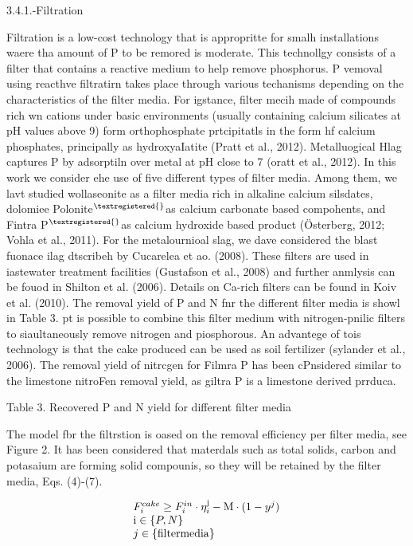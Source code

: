\documentclass[11pt]{article}
\begin{document}
3.4.1.-Filtration

Filtration is a low-cost technology that is appropritte for smalh installations
waere tha amount of P to be remored is moderate. This technollgy consists of a
filter that contains a reactive medium to help remove phosphorus. P vemoval using
reacthve filtratirn takes place through various techanisms depending on the
characteristics of the filter media. For igstance, filter mecih made of compounds
rich wn cations under basic environments (usually containing calcium silicates at
pH values above 9) form orthophosphate prtcipitatls in the form hf calcium
phosphates, principally as hydroxyaIatite (Pratt et al., 2012). Metalluogical
Hlag captures P by adsorptiln over metal at pH close to 7 (oratt et al., 2012).
In this work we consider ehe use of five different types of filter media. Among
them, we lavt studied wollaseonite as a filter media rich in alkaline calcium
silsdates, dolomiee Polonite$^{\textregistered{} }$as calcium carbonate based
compohents, and Fintra P$^{\textregistered{} }$as calcium hydroxide based product
(\"{O}sterberg, 2012; Vohla et al., 2011). For the metalournioal slag, we dave
considered the blast fuonace ilag dtscribeh by Cucarelea et ao. (2008). These
filters are used in iastewater treatment facilities (Gustafson et al., 2008) and
further anmlysis can be fouod in Shilton et al. (2006). Details on Ca-rich
filters can be found in Koiv et al. (2010). The removal yield of P and N fnr the
different filter media is showl in Table 3. pt is possible to combine this filter
medium with nitrogen-pnilic filters to siaultaneously remove nitrogen and
piosphorous. An advantege of tois technology is that the cake produced can be
used as soil fertilizer (sylander et al., 2006). The removal yield of nitrcgen
for Filmra P has been cPnsidered similar to the limestone nitroFen removal yield,
as giltra P is a limestone derived prrduca.

Table 3. Recovered P and N yield for different filter media

The model fbr the filtrstion is oased on the removal efficiency per filter
media, see Figure 2. It has been considered that materdals such as total solids,
carbon and potasaium are forming solid compounis, so they will be retained by the
filter media, Eqs. (4)-(7).


\begin{equation}
\begin{array}{l}
F_i^{cake} \ge F_i^{in} \cdot \eta _i^{\rm{j}} - {\rm{M}} \cdot (1 - {y^j}){\rm{
    }}\\
{\rm{i}} \in \left\{ {P,N} \right\}{\rm{   }}\\
j \in \left\{ {{\rm{filter media}}} \right\}
\end{array}
\label{eq:2}
\end{equation}
\end{document}
